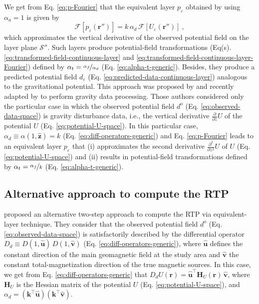 We get from Eq. \ref{eq:p-Fourier} that the equivalent layer $p_{\varepsilon}$ obtained by using
$\alpha_{a} = 1$ is given by
\begin{equation}
	\mathcal{F} [ p_{\varepsilon}(\mathbf{r}'') ] =
	k \, \alpha_{d} \, \mathcal{F} \left[ U_{\varepsilon}(\mathbf{r}'') \right]  \: ,
	\label{eq:p-Fourier-generalized-eqs}
\end{equation}
which approximates the vertical derivative of the observed potential field on the layer plane $\mathcal{S}''$. 
Such layers produce potential-field transformations (Eq(s). \ref{eq:transformed-field-continuous-layer} and 
\ref{eq:transformed-field-continuous-layer-Fourier}) defined by $\alpha_{t} = \nicefrac{\alpha_{f}}{\alpha_{d}}$ 
(Eq. \ref{eq:alpha-t-generic}). Besides, they produce a predicted potential field $d_{\varepsilon}$ 
(Eq. \ref{eq:predicted-data-continuous-layer}) analogous to the gravitational potential.
This approach was proposed by \cite{cordell1992} and recently adapted by 
\cite{soler_uieda2021} to perform gravity data processing. 
Those authors considered only the particular case in which the observed potential field $d^{o}$ 
(Eq. \ref{eq:observed-data-space}) is gravity disturbance data, i.e., the vertical derivative 
$\tfrac{\partial}{\partial z} U$ of the potential $U$ (Eq. \ref{eq:potential-U-space}).
In this particular case, $\alpha_{d} \equiv \alpha(1, \hat{\mathbf{z}}) = k$ (Eq. \ref{eq:diff-operators-generic})
and Eq. \ref{eq:p-Fourier} leads to an equivalent layer $p_{\varepsilon}$ that
(i) approximates the second derivative $\tfrac{\partial^{2}}{\partial z^{2}} U$ of $U$ (Eq. \ref{eq:potential-U-space}) 
and
(ii) results in potential-field transformations defined by $\alpha_{t} = \nicefrac{\alpha_{f}}{k}$ (Eq. \ref{eq:alpha-t-generic}).

\subsection{Alternative approach to compute the RTP}

\cite{guspi_novara2009} proposed an alternative two-step approach to compute the RTP via equivalent-layer technique. 
They consider that the observed potential field $d^{o}$ (Eq. \ref{eq:observed-data-space}) is satisfactorily described 
by the differential operator $D_{d} \equiv D(1, \hat{\mathbf{u}}) \, D(1, \hat{\mathbf{v}})$
(Eq. \ref{eq:diff-operators-generic}), where $\hat{\mathbf{u}}$ defines the constant direction of the main geomagnetic
field at the study area and $\hat{\mathbf{v}}$ the constant total-magnetization direction of the true magnetic sources.
In this case, we get from Eq. \ref{eq:diff-operators-generic} that 
$D_{d}U(\mathbf{r}) = \hat{\mathbf{u}}^{\top} \mathbf{H}_{U}(\mathbf{r}) \, \hat{\mathbf{v}}$,
where $\mathbf{H}_{U}$ is the Hessian matrix \citep[e.g.,][p. 158]{kaplan2002} of
the potential $U$ (Eq. \ref{eq:potential-U-space}), and 
$\alpha_{d} = \left(\mathbf{k}^{\top} \hat{\mathbf{u}} \right)\left(\mathbf{k}^{\top} \hat{\mathbf{v}} \right)$.

